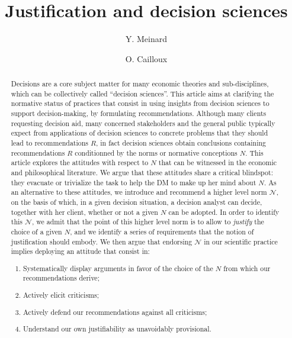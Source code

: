 \documentclass[preprint, french, english, 11pt, authoryear]{elsarticle}%
\newcommand{\adv}{\mathscr{N}}
\begin{document}
\hypersetup{citecolor=black}
\title{Justification and decision sciences}

\author[ld]{Y. Meinard}
\author[ld]{O. Cailloux}
\address[ld]{Universit\'e Paris-Dauphine, PSL Research University, CNRS, UMR [7243], LAMSADE, 75016 PARIS, FRANCE}

\begin{abstract}
Decisions are a core subject matter for many economic theories and sub-disciplines, which can be collectively called “decision sciences”. This article aims at clarifying the normative status of practices that consist in using insights from decision sciences to support decision-making, by formulating recommendations. Although many clients requesting decision aid, many concerned stakeholders and the general public typically expect from applications of decision sciences to concrete problems that they should lead to recommendations $R$, in fact decision sciences obtain conclusions containing recommendations $R$ conditionned by the norms or normative conceptions $N$. This article explores the attitudes with respect to $N$ that can be witnessed in the economic and philosophical literature. We argue that these attitudes share a critical blindspot: they evacuate or trivialize the task to help the \ac{DM} to make up her mind about $N$. As an alternative to these attitudes, we introduce and recommend a higher level norm $\adv$, on the basis of which, in a given decision situation, a decision analyst can decide, together with her client, whether or not a given $N$ can be adopted. In order to identify this $\adv$, we admit that the point of this higher level norm is to allow to \emph{justify} the choice of a given $N$, and we identify a series of requirements that the notion of justification should embody. We then argue that endorsing $\adv$ in our scientific practice implies deploying an attitude that consist in:
\begin{enumerate}[label=\roman*.]
	\item Systematically display arguments in favor of the choice of the $N$ from which our recommendations derive;
	\item Actively elicit criticisms;
	\item Actively defend our recommendations against all criticisms;
	\item Understand our own justifiability as unavoidably provisional.
\end{enumerate}
\end{abstract}
\end{document}

